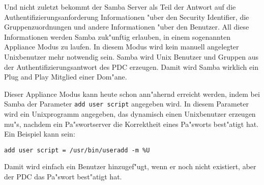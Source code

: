 \documentclass{scrartcl}
\newcommand{\param}{\texttt}
\begin{document}
Und nicht zuletzt bekommt der Samba Server als Teil der Antwort auf
die Authentifizierungsanforderung Informationen "uber den Security
Identifier, die Gruppenzuordnungen und andere Informationen "uber den
Benutzer. All diese Informationen werden Samba zuk"unftig erlauben, in
einem sogenannten Appliance Modus zu laufen. In diesem Modus wird
kein manuell angelegter Unixbenutzer mehr notwendig sein. Samba wird Unix
Benutzer und Gruppen aus der Authentifizierungsantwort des PDC
erzeugen. Damit wird Samba wirklich ein Plug and Play Mitglied einer
Dom"ane.

Dieser Appliance Modus kann heute schon ann"ahernd erreicht werden,
indem bei Samba der Parameter \param{add user script} angegeben wird.
In diesem Parameter wird ein Unixprogramm angegeben, das dynamisch
einen Unixbenutzer erzeugen mu"s, nachdem ein Pa"swortserver die
Korrektheit eines Pa"sworts best"atigt hat. Ein Beispiel kann sein:

\verb|add user script = /usr/bin/useradd -m %U|

Damit wird einfach ein Benutzer hinzugef"ugt, wenn er noch nicht
existiert, aber der PDC das Pa"swort best"atigt hat.
\end{document}
